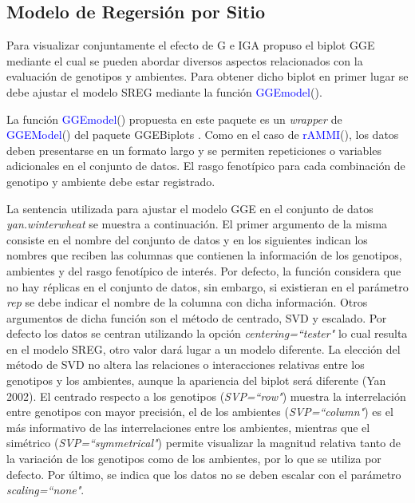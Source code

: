 \subsection{Modelo de Regersión por Sitio}

Para visualizar conjuntamente el efecto de G e IGA \citet{Yanetal2000} propuso el biplot GGE mediante el cual se pueden abordar diversos aspectos relacionados con la evaluación de genotipos y ambientes. Para obtener dicho biplot en primer lugar se debe ajustar el modelo SREG mediante la función \textcolor{blue}{GGEmodel}(). 

La función \textcolor{blue}{GGEmodel}() propuesta en este paquete es un \emph{wrapper} de \textcolor{blue}{GGEModel}() del paquete GGEBiplots \citep{Dumble2017}. Como en el caso de \textcolor{blue}{rAMMI}(), los datos deben presentarse en un formato largo y se permiten repeticiones o variables adicionales en el conjunto de datos. El rasgo fenotípico para cada combinación de genotipo y ambiente debe estar registrado. 

La sentencia utilizada para ajustar el modelo GGE en el conjunto de datos \emph{yan.winterwheat} se muestra a continuación. El primer argumento de la misma consiste en el nombre del conjunto de datos y en los siguientes indican los nombres que reciben las columnas que contienen la información de los genotipos, ambientes y del rasgo fenotípico de interés. Por defecto, la función considera que no hay réplicas en el conjunto de datos, sin embargo, si existieran en el parámetro \emph{rep} se debe indicar el nombre de la columna con dicha información. Otros argumentos de dicha función son el método de centrado, SVD y escalado. Por defecto los datos se centran utilizando la opción \emph{centering=``tester"} lo cual resulta en el modelo SREG, otro valor dará lugar a un modelo diferente. La elección del método de SVD no altera las relaciones o interacciones relativas entre los genotipos y los ambientes, aunque la apariencia del biplot será diferente (Yan 2002). El centrado respecto a los genotipos (\emph{SVP=``row"}) muestra la interrelación entre genotipos con mayor precisión, el de los ambientes (\emph{SVP=``column"}) es el más informativo de las interrelaciones entre los ambientes, mientras que el simétrico (\emph{SVP=``symmetrical"}) permite visualizar la magnitud relativa tanto de la variación de los genotipos como de los ambientes, por lo que se utiliza por defecto. Por último, se indica que los datos no se deben escalar con el parámetro \emph{scaling=``none"}. 


